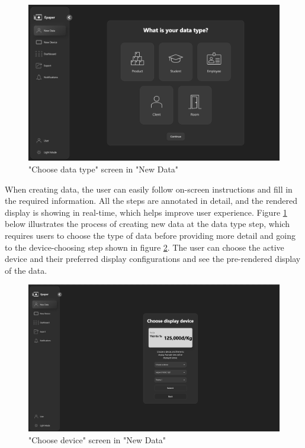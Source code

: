 \documentclass[../Main.tex]{subfiles}
\begin{document}
\begin{figure}[H]
    \centering
    \includegraphics[width=0.95\linewidth]{doc//imgs/ui_new-data-type.png}
    \caption{"Choose data type" screen in "New Data"}
    \label{fig:new-data-type}
\end{figure}


When creating data, the user can easily follow on-screen instructions and fill in the required information. All the steps are annotated in detail, and the rendered display is showing in real-time, which helps improve user experience. Figure \ref{fig:new-data-type} below illustrates the process of creating new data at the data type step, which requires users to choose the type of data before providing more detail and going to the device-choosing step shown in figure \ref{fig:new-data}. The user can choose the active device and their preferred display configurations and see the pre-rendered display of the data.
\begin{figure}[H]
    \centering
    \includegraphics[width=0.95\linewidth]{doc//imgs/ui_new-data.png}
    \caption{"Choose device" screen in "New Data"}
    \label{fig:new-data}
\end{figure}
\end{document}
